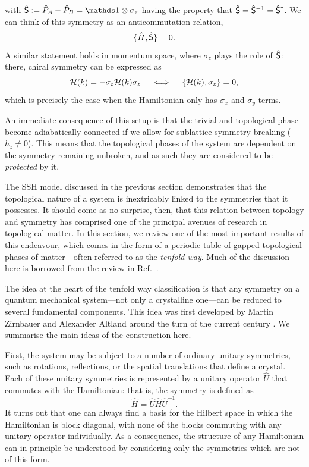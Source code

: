 with $\hat{\CHR}:= \hat{P}_A - \hat{P}_B = \Id\otimes\sigma_z$ having the property that $\hat{\mathsf{S}} = \hat{\mathsf{S}}^{-1} = \hat{\mathsf{S}}^\dag$. We can think of this symmetry as an anticommutation relation,
\begin{equation}\label{eq:chiral-operator}
	\{\hat{H},\hat{\mathsf{S}}\} = 0.
\end{equation}
A similar statement holds in momentum space, where $\sigma_z$ plays the role of $\hat{\mathsf{S}}$: there, chiral symmetry can be expressed as
\begin{equation}\label{eq:chiral-momentum}
	\mathcal{H}(k) = -\sigma_z\mathcal{H}(k)\sigma_z \quad\iff\quad \{\mathcal{H}(k),\sigma_z\} = 0,
\end{equation}
which is precisely the case when the Hamiltonian only has $\sigma_x$ and $\sigma_y$ terms.

An immediate consequence of this setup is that the trivial and topological phase become adiabatically connected if we allow for sublattice symmetry breaking ($h_z \neq 0$). This means that the topological phases of the system are dependent on the symmetry remaining unbroken, and as such they are considered to be \emph{protected} by it.


\label{sec:symm-classes}

The SSH model discussed in the previous section demonstrates that the topological nature of a system is inextricably linked to the symmetries that it possesses. It should come as no surprise, then, that this relation between topology and symmetry has comprised one of the principal avenues of research in topological matter. In this section, we review one of the most important results of this endeavour, which comes in the form of a periodic table of gapped topological phases of matter---often referred to as the \emph{tenfold way}. Much of the discussion here is borrowed from the review in Ref.~\cite{Ludwig_tenfold-way}.

The idea at the heart of the tenfold way classification is that any symmetry on a quantum mechanical system---not only a crystalline one---can be reduced to several fundamental components. This idea was first developed by Martin Zirnbauer and Alexander Altland around the turn of the current century \cite{Zirnbauer_random-matrix,AltlandZirnbauer_symm-classes,Heinzner_symm-classes}. We summarise the main ideas of the construction here.

First, the system may be subject to a number of ordinary unitary symmetries, such as rotations, reflections, or the spatial translations that define a crystal. Each of these unitary symmetries is represented by a unitary operator $\hat{U}$ that commutes with the Hamiltonian: that is, the symmetry is defined as
\begin{equation*}
	\hat{H} = \hat{U}\hat{H}\hat{U}^{-1}.
\end{equation*}
It turns out that one can always find a basis for the Hilbert space in which the Hamiltonian is block diagonal, with none of the blocks commuting with any unitary operator individually. As a consequence, the structure of any Hamiltonian can in principle be understood by considering only the symmetries which are not of this form.


